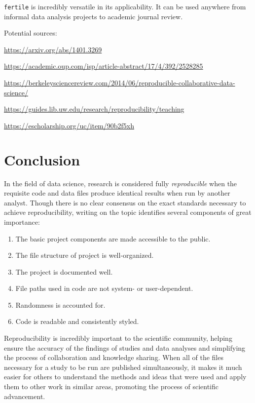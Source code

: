 \documentclass[12pt,twoside]{reedthesis}
\begin{document}
\texttt{fertile} is incredibly versatile in its applicability. It can be
used anywhere from informal data analysis projects to academic journal
review.

Potential sources:

\url{https://arxiv.org/abs/1401.3269}

\url{https://academic.oup.com/isp/article-abstract/17/4/392/2528285}

\url{https://berkeleysciencereview.com/2014/06/reproducible-collaborative-data-science/}

\url{https://guides.lib.uw.edu/research/reproducibility/teaching}

\url{https://escholarship.org/uc/item/90b2f5xh}

\chapter*{Conclusion}\label{conclusion}

In the field of data science, research is considered fully
\emph{reproducible} when the requisite code and data files produce
identical results when run by another analyst. Though there is no clear
consensus on the exact standards necessary to achieve reproducibility,
writing on the topic identifies several components of great importance:
\begin{enumerate}
\def\labelenumi{\arabic{enumi}.}
\item
  The basic project components are made accessible to the public.
\item
  The file structure of project is well-organized.
\item
  The project is documented well.
\item
  File paths used in code are not system- or user-dependent.
\item
  Randomness is accounted for.
\item
  Code is readable and consistently styled.
\end{enumerate}
Reproducibility is incredibly important to the scientific community,
helping ensure the accuracy of the findings of studies and data analyses
and simplifying the process of collaboration and knowledge sharing. When
all of the files necessary for a study to be run are published
simultaneously, it makes it much easier for others to understand the
methods and ideas that were used and apply them to other work in similar
areas, promoting the process of scientific advancement.
\end{document}
